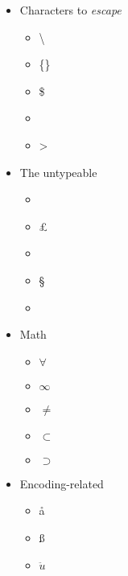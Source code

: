 \begin{itemize}
    \item Characters to \textit{escape}
    \begin{itemize}
        \item \textbackslash
        \item \{\}
        \item \$
        \item \textunderscore
        \item \textgreater
    \end{itemize}
    \item The untypeable
    \begin{itemize}
        \item \dag
        \item \pounds
        \item \texttrademark
        \item \S
        \item \textquestiondown
    \end{itemize}
    \item Math
    \begin{itemize}
        \item $\forall$
        \item $\infty$
        \item $\neq$
        \item $\subset$
        \item $\supset$
    \end{itemize}
    \item Encoding-related
    \begin{itemize}
        \item  \aa
        \item \ss
        \item $\ddot{u}$  
    \end{itemize}
\end{itemize}
